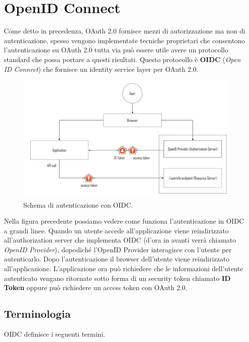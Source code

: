 \chapter{OpenID Connect}

Come detto in precedenza, OAuth 2.0 fornisce mezzi di autorizzazione ma non di
autenticazione, spesso vengono implementate tecniche proprietari che consentono
l'autenticazione su OAuth 2.0 tutta via può essere utile avere un protocollo standard
che possa portare a questi risultati.
Questo protocollo è \textbf{OIDC} (\textit{Open ID Connect}) che fornisce un identity service layer
per OAuth 2.0.

\begin{figure}[H]
      \centering
      \includegraphics[width=\textwidth, keepaspectratio]{capitoli/id_managing/imgs/oidc1.png}
      \caption{Schema di autenticazione con OIDC.}
\end{figure}

Nella figura precedente possiamo vedere come funziona l'autenticazione in OIDC a
grandi linee.
Quando un utente accede all'applicazione viene reindirizzato all'authorization server
che implementa OIDC (d'ora in avanti verrà chiamato \textit{OpenID Provider}),
dopodiché l'OpenID Provider interagisce con l'utente per autenticarlo.
Dopo l'autenticazione il browser dell'utente viene reindirizzato all'applicazione.
L'applicazione ora può richiedere che le informazioni dell'utente autenticato vengano
ritornate sotto forma di un security token chiamato \textbf{ID Token} oppure può
richiedere un access token con OAuth 2.0.

\section{Terminologia}

OIDC definisce i seguenti termini.

